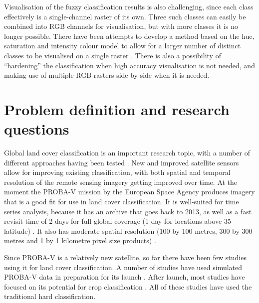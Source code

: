 \documentclass[a4paper,10pt]{article}
\begin{document}
Visualisation of the fuzzy classification results is also challenging, since each class effectively is a single-channel raster of its own. Three such classes can easily be combined into RGB channels for visualisation, but with more classes it is no longer possible. There have been attempts to develop a method based on the hue, saturation and intensity colour model to allow for a larger number of distinct classes to be visualised on a single raster \cite{hengl2004fuzzycmeans}. There is also a possibility of ``hardening'' the classification when high accuracy visualisation is not needed, and making use of multiple RGB rasters side-by-side when it is needed.

\section{Problem definition and research questions}

Global land cover classification is an important research topic, with a number of different approaches having been tested \cite{hansen2000hardtree}. New and improved satellite sensors allow for improving existing classification, with both spatial and temporal resolution of the remote sensing imagery getting improved over time. At the moment the PROBA-V mission by the European Space Agency produces imagery that is a good fit for use in land cover classification. It is well-suited for time series analysis, because it has an archive that goes back to 2013, as well as a fast revisit time of 2 days for full global coverage (1 day for locations above 35\textdegree{} latitude) \cite{dierckx2014probav}. It also has moderate spatial resolution (100 by 100 metres, 300 by 300 metres and 1 by 1 kilometre pixel size products) \cite{probavguide}.

Since PROBA-V is a relatively new satellite, so far there have been few studies using it for land cover classification. A number of studies have used simulated PROBA-V data in preparation for its launch \cite{stathakis2014probavurban} \cite{roumenina2013probavcrops} \cite{bartalev2014probavboreal}. After launch, most studies have focused on its potential for crop classification \cite{roumenina2015probavcrops} \cite{durgun2016crop} \cite{lambert2016cropland}. All of these studies have used the traditional hard classification.
\end{document}

